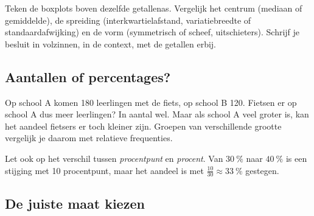 \begin{werkwijze}
Teken de boxplots boven dezelfde getallenas. Vergelijk het centrum (mediaan of gemiddelde), de spreiding (interkwartielafstand, variatiebreedte of standaardafwijking) en de vorm (symmetrisch of scheef, uitschieters). Schrijf je besluit in volzinnen, in de context, met de getallen erbij.
\end{werkwijze}

\begin{oefeningen}
\end{oefeningen}

\subsection{Aantallen of percentages?}

Op school A komen 180 leerlingen met de fiets, op school B 120. Fietsen er op school A dus meer leerlingen? In aantal wel. Maar als school A veel groter is, kan het aandeel fietsers er toch kleiner zijn. Groepen van verschillende grootte vergelijk je daarom met relatieve frequenties.


Let ook op het verschil tussen \textit{procentpunt} en \textit{procent}. Van $30~\%$ naar $40~\%$ is een stijging met 10 procentpunt, maar het aandeel is met $\tfrac{10}{30} \approx 33~\%$ gestegen.

\begin{oefeningen}
\end{oefeningen}

\subsection{De juiste maat kiezen}

